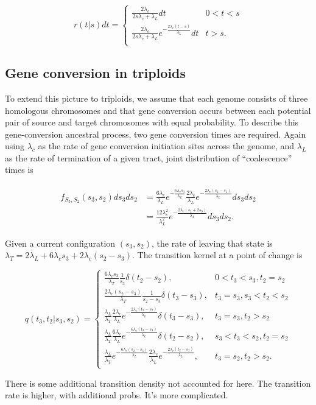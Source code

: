 \documentclass{article}
\begin{document}
\begin{equation}
    r(t|s)dt = 
    \begin{cases}
        \frac{2\lambda_c}{2s\lambda_c+\lambda_L}dt & 0<t<s\\
        \frac{2\lambda_c}{2s\lambda_c+\lambda_L}e^{-\frac{2\lambda_c(t-s)}{\lambda_L}}dt &  t>s.\\
    \end{cases}
\end{equation}

\subsection{Gene conversion in triploids}

To extend this picture to triploids, we assume that each genome consists of
three homologous chromosomes and that gene conversion occurs between each
potential pair of source and target chromosomes with equal probability. To
describe this gene-conversion ancestral process, two gene conversion times are
required. Again using $\lambda_c$ as the rate of gene conversion initiation
sites across the genome, and $\lambda_L$ as the rate of termination of a given
tract, joint distribution of ``coalescence'' times is

\begin{align}
    \begin{split}
        f_{S_3,S_2}(s_3,s_2)ds_3ds_2 &=
            \frac{6\lambda_c}{\lambda_L}e^{-\frac{6\lambda_cs_3}{\lambda_L}}
            \frac{2\lambda_c}{\lambda_L}e^{-\frac{2\lambda_c(s_2-s_3)}{\lambda_L}}ds_3ds_2\\
            &=
            \frac{12\lambda_c^2}{\lambda_L^2}e^{-\frac{2\lambda_c(s_2+2s_3)}{\lambda_L}}ds_3ds_2.
    \end{split}
\end{align}

Given a current configuration $(s_3, s_2)$, the rate of leaving that state is
$\lambda_T = 2\lambda_L + 6\lambda_cs_3 + 2\lambda_c(s_2-s_3)$. The transition kernel at a
point of change is

\begin{equation}
    q(t_3,t_2|s_3,s_2) =
    \begin{cases}
        \frac{6\lambda_cs_3}{\lambda_T}\frac{1}{s_3}\delta(t_2-s_2), & 0<t_3<s_3, t_2=s_2\\[0.75em]
        \frac{2\lambda_c(s_2-s_3)}{\lambda_T}\frac{1}{s_2-s_3}\delta(t_3-s_3), & t_3=s_3, s_3 < t_2 < s_2\\[0.75em]
        \frac{\lambda_L}{\lambda_T}\frac{2\lambda_c}{\lambda_L}e^{-\frac{2\lambda_c(t_2-s_2)}{\lambda_L}}\delta(t_3-s_3),&t_3=s_3,t_2>s_2\\[0.75em]
        \frac{\lambda_L}{\lambda_T}\frac{6\lambda_c}{\lambda_L}e^{-\frac{6\lambda_c(t_3-s_3)}{\lambda_L}}\delta(t_2-s_2),&s_3<t_3<s_2,t_2=s_2\\[0.75em]
        \frac{\lambda_L}{\lambda_T}e^{-\frac{6\lambda_c(s_2-s_3)}{\lambda_L}}\frac{2\lambda_c}{\lambda_L}e^{-\frac{2\lambda_c(t_2-s_2)}{\lambda_L}},&t_3=s_2,t_2>s_2.\\[0.75em]
    \end{cases}
\end{equation}

There is some additional transition density not accounted for here. The
transition rate is higher, with additional probs. It's more complicated.
\end{document}

